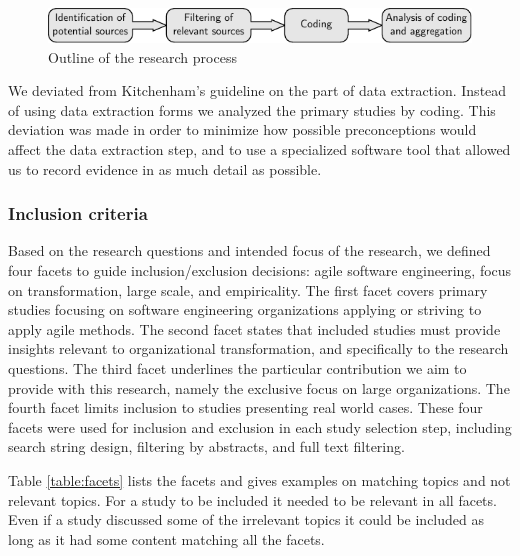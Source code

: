 \documentclass[preprint,authoryear,12pt]{elsarticle}
\begin{document}
\begin{figure}[b]
  \begin{center}
    \includegraphics{graphics/research_process.pdf}
    \caption{Outline of the research process}
    \label{fig:researchprocess}
  \end{center}
\end{figure}

We deviated from Kitchenham's guideline on the part of data extraction. Instead
of using data extraction forms we analyzed the primary studies by coding. This
deviation was made in order to minimize how possible preconceptions would affect
the data extraction step, and to use a specialized software tool that allowed us
to record evidence in as much detail as possible.

\subsubsection{Inclusion criteria}
\label{sec:inclusioncriteria}

Based on the research questions and intended focus of the research, we defined
four facets to guide inclusion/exclusion decisions: agile software engineering,
focus on transformation, large scale, and empiricality. The first facet covers
primary studies focusing on software engineering organizations applying or
striving to apply agile methods. The second facet states that included studies
must provide insights relevant to organizational transformation, and
specifically to the research questions. The third facet underlines the
particular contribution we aim to provide with this research, namely the
exclusive focus on large organizations. The fourth facet limits inclusion to
studies presenting real world cases. These four facets were used for inclusion
and exclusion in each study selection step, including search string design,
filtering by abstracts, and full text filtering.

Table \ref{table:facets} lists the facets and gives examples on matching topics
and not relevant topics. For a study to be included it needed to be relevant
in all facets. Even if a study discussed some of the irrelevant topics it could
be included as long as it had some content matching all the facets.
\end{document}
